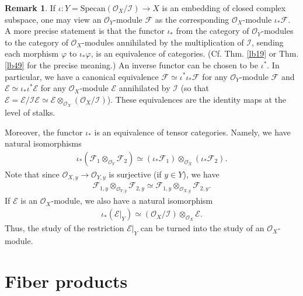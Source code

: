 \documentclass[12pt,b5paper,notitlepage]{report}
\theoremstyle{definition}
\newtheorem{rem}[df]{Remark}
\theoremstyle{plain}
\newcommand{\mc}{\mathcal}
\newcommand{\scr}{\mathscr}
\newcommand{\Specan}{\mathrm{Specan}}
\numberwithin{equation}{section}
\begin{document}
\begin{rem}\label{lb52}
If $\iota:Y=\Specan(\scr O_X/\mc I)\rightarrow X$ is an embedding of closed complex subspace, one may view an $\scr O_Y$-module $\scr F$ as the corresponding $\scr O_X$-module $\iota_*\scr F$. A more precise statement is that the functor $\iota_*$ from the category of $\scr O_Y$-modules to the category of $\scr O_X$-modules annihilated by the multiplication of $\mc I$, sending each morphism $\varphi$ to $\iota_*\varphi$, is an equivalence of categories. (Cf. Thm. \ref{lb19} or Thm. \ref{lb49} for the precise meaning.) An inverse functor can be chosen to be $\iota^*$. In particular, we have a canonical equivalence $\scr F\simeq\iota^*\iota_*\scr F$ for any $\scr O_Y$-module $\scr F$ and $\scr E\simeq\iota_*\iota^*\scr E$ for any $\scr O_X$-module $\scr E$ annihilated by $\mc I$ (so that $\scr E=\scr E/\mc I\scr E\simeq\scr E\otimes_{\scr O_X}(\scr O_X/\mc I)$). These equivalences are the identity maps at the level of stalks.

Moreover, the functor $\iota_*$ is an equivalence of tensor categories. Namely, we have natural isomorphisms
\begin{gather*}
\iota_*(\scr F_1\otimes_{\scr O_Y}\scr F_2)\simeq (\iota_*\scr F_1)\otimes_{\scr O_X}(\iota_*\scr F_2).
\end{gather*}
Note that since $\scr O_{X,y}\rightarrow\scr O_{Y,y}$ is surjective (if $y\in Y$), we have
\begin{align}
\scr F_{1,y}\otimes_{\scr O_{Y,y}}\scr F_{2,y}\simeq \scr F_{1,y}\otimes_{\scr O_{X,y}}\scr F_{2,y}.
\end{align}
If $\scr E$ is an $\scr O_X$-module, we also have a natural isomorphism
\begin{align}
\iota_*(\scr E|_Y)\simeq (\scr O_X/\mc I)\otimes_{\scr O_X}\scr E.
\end{align}
Thus, the study of the restriction $\scr E|_Y$ can be turned into the study of an $\scr O_X$-module. \hfill\qedsymbol
\end{rem}




\section{Fiber products}
\end{document}

